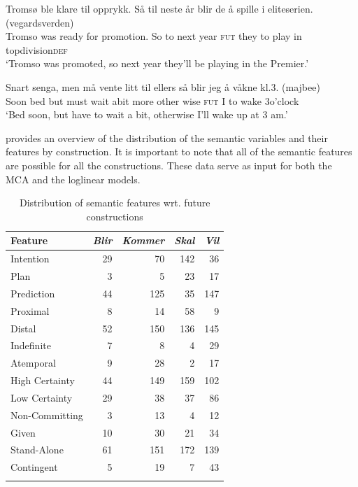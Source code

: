 \documentclass[output=paper,colorlinks,citecolor=brown]{langscibook}
\begin{document}
\ea\label{ex:06:19}
\gll Tromsø ble klare til opprykk. Så til neste år blir de å spille i eliteserien. (vegardsverden)\\
     Tromso was ready for promotion. So to next year \textsc{fut} they to play in topdivision\textsc{def}\\
\glt ‘Tromso was promoted, so next year they’ll be playing in the Premier.’
\z

\ea\label{ex:06:20}
\gll Snart senga, men må vente litt til ellers så blir jeg å våkne kl.3. (majbee)\\
     Soon bed but must wait abit more other wise \textsc{fut} I to wake 3o'clock\\
\glt ‘Bed soon, but have to wait a bit, otherwise I’ll wake up at 3 am.’
\z

 provides an overview of the distribution of the semantic variables and their features by construction. It is important to note that all of the semantic features are possible for all the constructions. These data serve as input for both the MCA and the loglinear models.

\begin{table}
\caption{Distribution of semantic features wrt. future constructions}
\label{tab:mikk_glynn:features}
 \begin{tabularx}{.8\textwidth}{X rrrr}
  \lsptoprule
Feature   & \textit{Blir} & \textit{Kommer} & \textit{Skal} & \textit{Vil}\\
  \midrule
  Intention  & 29 & 70 & 142 & 36\\
  Plan  & 3 & 5 & 23 & 17\\
  Prediction  & 44 & 125 & 35 & 147\\
  Proximal  & 8 & 14 & 58 & 9\\
  Distal  & 52 & 150 & 136 & 145\\
  Indefinite  & 7 & 8 & 4 & 29\\
  Atemporal  & 9 & 28 & 2 & 17\\
  High Certainty  & 44 & 149 & 159 & 102\\
  Low Certainty  & 29 & 38 & 37 & 86\\
  Non-Committing  & 3 & 13 & 4 & 12\\
  Given  & 10 & 30 & 21 & 34\\
  Stand-Alone  & 61 & 151 & 172 & 139\\
  Contingent  & 5 & 19 & 7 & 43\\
  \lspbottomrule
 \end{tabularx}
\end{table}
\end{document}
